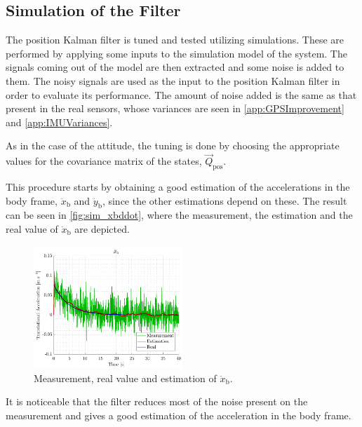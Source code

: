 \subsection{Simulation of the Filter}
The position Kalman filter is tuned and tested utilizing simulations. These are performed by applying some inputs to the simulation model of the system. The signals coming out of the model are then extracted and some noise is added to them. The noisy signals are used as the input to the position Kalman filter in order to evaluate its performance. The amount of noise added is the same as that present in the real sensors, whose variances are seen in \autoref{app:GPSImprovement} and \ref{app:IMUVariances}.

As in the case of the attitude, the tuning is done by choosing the appropriate values for the covariance matrix of the states, $\vec{Q}_\mathrm{pos}$. 

This procedure starts by obtaining a good estimation of the accelerations in the body frame, $\ddot{x}_\mathrm{b}$ and $\ddot{y}_\mathrm{b}$, since the other estimations depend on these. The result can be seen in \autoref{fig:sim_xbddot}, where the measurement, the estimation and the real value of $\ddot{x}_\mathrm{b}$ are depicted.
\begin{figure}[H]
    \includegraphics[width=0.5\textwidth]{figures/sim_xbddot}
    \caption{ Measurement, real value and estimation of $\ddot{x}_\mathrm{b}$.}
    \label{fig:sim_xbddot}
\end{figure}
%
It is noticeable that the filter reduces most of the noise present on the measurement and gives a good estimation of the acceleration in the body frame.
 
